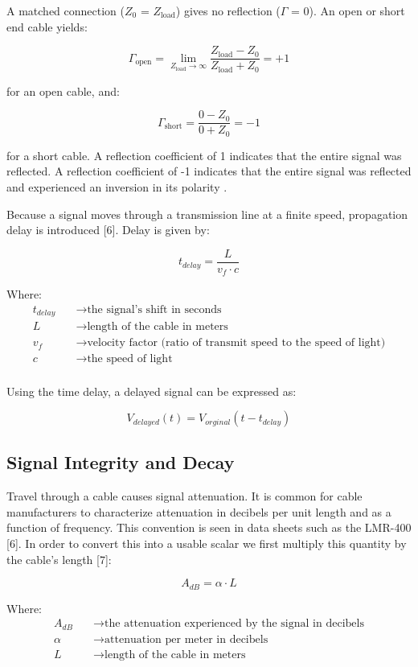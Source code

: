 \documentclass[10pt]{article}
\begin{document}
 A matched connection ($Z_0$ = $Z_{\text{load}}$) gives no reflection ($\Gamma$ = 0). An open or short end cable yields:

$$
\Gamma_{\text{open}} = \lim_{Z_{\text{load}} \to \infty} \frac{Z_{\text{load}} - Z_0}{Z_{\text{load}} + Z_0} = +1
$$

for an open cable, and: 

$$
\Gamma_{\text{short}} =  \frac{0- Z_0}{0 + Z_0} = -1
$$

for a short cable. A reflection coefficient of 1 indicates that the entire signal was reflected. A reflection coefficient of -1 indicates that the entire signal was reflected and experienced an inversion in its polarity .

Because a signal moves through a transmission line at a finite speed, propagation delay is introduced [6]. Delay is given by:

$$
t_{delay} = \frac{L}{v_f \cdot c}
$$

Where:
\begin{align*}
t_{delay} &\quad\to \text{the signal's shift in seconds} \\
L   &\quad\to \text{length of the cable in meters} \\
v_f    &\quad\to \text{velocity factor (ratio of transmit speed to the speed of light)} \\
c    &\quad\to \text{the speed of light} \\
\end{align*}

Using the time delay, a delayed signal can be expressed as:

$$
V_{delayed}(t) = V_{orginal}(t - t_{delay})
$$

\subsection{Signal Integrity and Decay}

Travel through a cable causes signal attenuation. It is common for cable manufacturers to characterize attenuation in decibels per unit length and as a function of frequency. This convention is seen in data sheets such as the LMR-400 [6]. In order to convert this into a usable scalar we first multiply this quantity by the cable's length [7]:

$$
A_{dB} = \alpha \cdot L
$$

Where:
\begin{align*}
A_{dB} &\quad\to \text{the attenuation experienced by the signal in decibels} \\
\alpha   &\quad\to \text{attenuation per meter in decibels} \\
L   &\quad\to \text{length of the cable in meters} \\
\end{align*}
\end{document}
